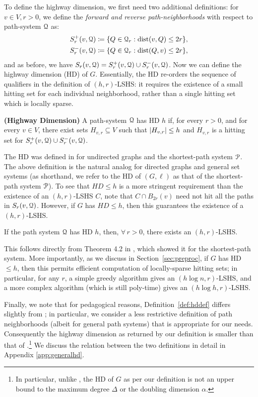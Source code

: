 To define the highway dimension, we first need two additional definitions:
for $v\in V, r>0$, we define the \emph{forward and reverse path-neighborhoods} with respect to path-system $\mathcal{Q}$ as: 
\begin{align*}
S_r^+(v,\calQ) &\defeq\crl*{Q\in\calQ_r: \dist(v,Q)\leq 2r}, \\  
S_r^-(v,\calQ) &\defeq\crl*{Q\in\calQ_r: \dist(Q,v)\leq 2r},
\end{align*}
and as before, we have $S_r(v,\mathcal{Q}) = S_r^+(v,\mathcal{Q})\cup S_r^-(v,\mathcal{Q})$. Now we can define the highway dimension (HD) of $G$. Essentially, the HD re-orders the sequence of qualifiers in the definition of $(h,r)$-LSHS: it requires the existence of a small hitting set for each individual neighborhood, rather than a single hitting set which is locally sparse. 
\begin{definition}
\label{def:hddef}
\textbf{(Highway Dimension)}
A path-system $\mathcal{Q}$ has HD $h$ if, for every $r>0$, and for every $v\in V$, there exist sets $H_{v,r}\subseteq V$ such that $\lvert H_{v,r}\rvert\leq h$ and $H_{v,r}$ is a hitting set for $S_r^+(v,\mathcal{Q})\cup S_r^-(v,\mathcal{Q})$.
\end{definition}
The HD was defined in \cite{highway2013} for undirected graphs and the shortest-path system $\mathcal{P}$. 
The above definition is the natural analog for directed graphs and general set systems (as shorthand, we refer to the HD of $(G,\ell)$ as that of the shortest-path system $\mathcal{P}$). 
To see that $HD\leq h$ is a more stringent requirement than the existence of an $(h,r)$-LSHS $C$, note that $C\cap B_{2r}(v)$ need not hit all the paths in $S_r(v,\mathcal{Q})$. 
However, if $G$ has $HD\leq h$, then this guarantees the existence of a $(h,r)$-LSHS.
\begin{proposition}
If the path system $\mathcal{Q}$ has HD $h$, then, $\forall\,r>0$, there exists an $(h,r)$-LSHS.
\end{proposition}
This follows directly from Theorem 4.2 in \cite{highway2013}, which showed it for the shortest-path system. More importantly, as we discuss in Section~\ref{sec:preproc}, if $G$ has HD$\leq h$, then this permits efficient computation of locally-sparse hitting sets; in particular, for any $r$, a simple greedy algorithm gives an $(h\log n,r)$-LSHS, and a more complex algorithm (which is still poly-time) gives an $(h\log h,r)$-LSHS.


Finally, we note that for pedagogical reasons, Definition~\ref{def:hddef} differs slightly from \cite{highway2013}; in particular, we consider a less restrictive definition of path neighborhoods (albeit for general path systems) that is appropriate for our needs. Consequently the highway dimension as returned by our definition is smaller than that of \cite{highway2013}.\footnote{In particular, unlike \cite{highway2013}, the HD of $G$ as per our definition is not an upper bound to the maximum degree $\Delta$ or the doubling dimension $\alpha$.}
We discuss the relation between the two definitions in detail in Appendix \ref{app:generalhd}. 

